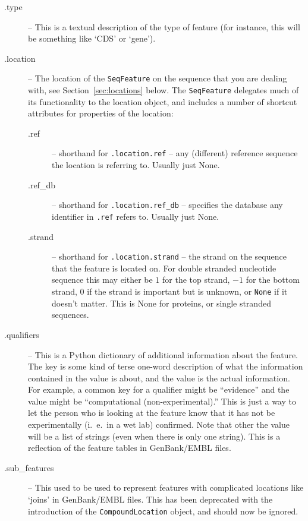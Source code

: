 \documentclass{report}
\begin{document}
\begin{description}
  \item[.type] -- This is a textual description of the type of feature (for instance, this will be something like `CDS' or `gene').

  \item[.location] -- The location of the \verb|SeqFeature| on the sequence
  that you are dealing with, see Section~\ref{sec:locations} below. The
  \verb|SeqFeature| delegates much of its functionality to the location
  object, and includes a number of shortcut attributes for properties
  of the location:

  \begin{description}
    \item[.ref] -- shorthand for \verb|.location.ref| -- any (different)
    reference sequence the location is referring to. Usually just None.

    \item[.ref\_db] -- shorthand for \verb|.location.ref_db| -- specifies
    the database any identifier in \verb|.ref| refers to. Usually just None.

    \item[.strand] -- shorthand for \verb|.location.strand| -- the strand on
    the sequence that the feature is located on. For double stranded nucleotide
    sequence this may either be $1$ for the top strand, $-1$ for the bottom
    strand, $0$ if the strand is important but is unknown, or \texttt{None}
    if it doesn't matter. This is None for proteins, or single stranded sequences.
  \end{description}

  \item[.qualifiers] -- This is a Python dictionary of additional information about the feature. The key is some kind of terse one-word description of what the information contained in the value is about, and the value is the actual information. For example, a common key for a qualifier might be ``evidence'' and the value might be ``computational (non-experimental).'' This is just a way to let the person who is looking at the feature know that it has not be experimentally (i.~e.~in a wet lab) confirmed. Note that other the value will be a list of strings (even when there is only one string). This is a reflection of the feature tables in GenBank/EMBL files.
 
  \item[.sub\_features] -- This used to be used to represent features with complicated locations like `joins' in GenBank/EMBL files. This has been deprecated with the introduction of the \verb|CompoundLocation| object, and should now be ignored.
  
\end{description}
\end{document}
